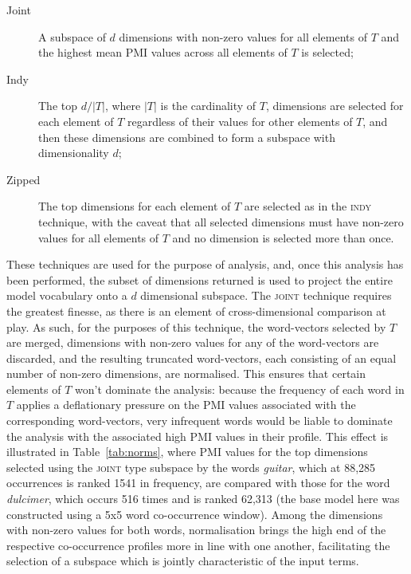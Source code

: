 \begin{description}
\item[Joint] A subspace of $d$ dimensions with non-zero values for all elements of $T$ and the highest mean PMI values across all elements of $T$ is selected;
\item[Indy] The top $d/|T|$, where $|T|$ is the cardinality of $T$, dimensions are selected for each element of $T$ regardless of their values for other elements of $T$, and then these dimensions are combined to form a subspace with dimensionality $d$;
\item[Zipped] The top dimensions for each element of $T$ are selected as in the \textsc{indy} technique, with the caveat that all selected dimensions must have non-zero values for all elements of $T$ and no dimension is selected more than once.
\end{description}

These techniques are used for the purpose of analysis, and, once this analysis has been performed, the subset of dimensions returned is used to project the entire model vocabulary onto a $d$ dimensional subspace.  The \textsc{joint} technique requires the greatest finesse, as there is an element of cross-dimensional comparison at play.  As such, for the purposes of this technique, the word-vectors selected by $T$ are merged, dimensions with non-zero values for any of the word-vectors are discarded, and the resulting truncated word-vectors, each consisting of an equal number of non-zero dimensions, are normalised.  This ensures that certain elements of $T$ won't dominate the analysis: because the frequency of each word in $T$ applies a deflationary pressure on the PMI values associated with the corresponding word-vectors, very infrequent words would be liable to dominate the analysis with the associated high PMI values in their profile.  This effect is illustrated in Table~\ref{tab:norms}, where PMI values for the top dimensions selected using the \textsc{joint} type subspace by the words \emph{guitar}, which at 88,285 occurrences is ranked 1541 in frequency, are compared with those for the word \emph{dulcimer}, which occurs 516 times and is ranked 62,313 (the base model here was constructed using a 5x5 word co-occurrence window).  Among the dimensions with non-zero values for both words, normalisation brings the high end of the respective co-occurrence profiles more in line with one another, facilitating the selection of a subspace which is jointly characteristic of the input terms.

